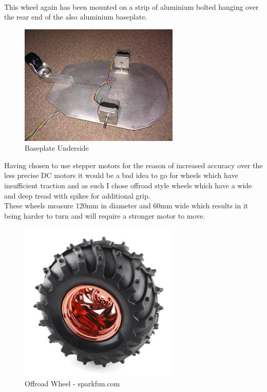 \\This wheel again has been mounted on a strip of aluminium bolted hanging over the rear end of the also aluminium baseplate.
\begin{figure}[h]
\centering
        \includegraphics[width=3.0in]  {Images/baseplate-underside.jpg}
        \caption{Baseplate Underside}
        \label{Baseplate Underside}
\end{figure}
Having chosen to use stepper motors for the reason of increased accuracy over the less precise DC motors it would be a bad idea to go for wheels which have insufficient traction and as such I chose offroad style wheels which have a wide and deep tread with spikes for additional grip.
\\These wheels measure 120mm in diameter and 60mm wide which results in it being harder to turn and will require a stronger motor to move.
\begin{figure}[h]
\centering
        \includegraphics[width=3.0in]  {Images/wheel-offroad.jpg}
        \caption{Offroad Wheel - sparkfun.com}
        \label{Offroad Wheel}
\end{figure}
